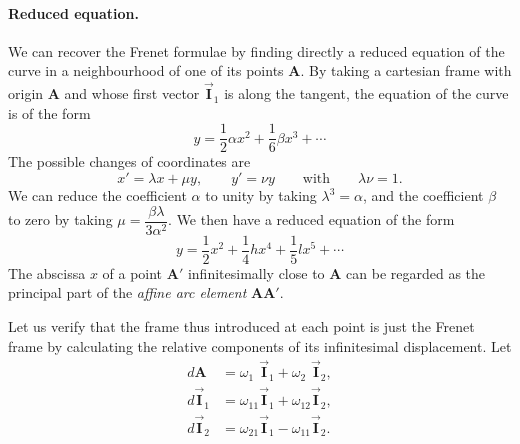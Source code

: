 \documentclass[leqno,11pt]{book}
\numberwithin{equation}{chapter}
\theoremstyle{shape1}
\theoremstyle{shapesmall}
\newcommand{\rvec}[1]{\vec{\mathbf{#1}}}
\newcommand{\ivec}{\rvec{I}}
\begin{document}
\paragraph{Reduced equation.}
\label{sec:139}
We can recover the Frenet formulae by finding directly a reduced equation of the curve in a neighbourhood of one of its points $\mathbf{A}$. By taking a cartesian frame with origin $\mathbf{A}$ and whose first vector $\ivec_{1}$ is along the tangent, the equation of the curve is of the form
\[
y=\frac{1}{2}\alpha x^{2}+\frac{1}{6}\beta x^{3}+\cdots
\]
The possible changes of coordinates are
\[
x'=\lambda x+\mu y,\qquad y'=\nu y\qquad\text{with}\qquad\lambda \nu=1.
\]
We can reduce the coefficient $\alpha$ to unity by taking $\lambda^{3}=\alpha$, and the coefficient $\beta$ to zero by taking $\mu=\dfrac{\beta\lambda}{3\alpha^{2}}$. We then have a reduced equation of the form
\[
y=\frac{1}{2}x^{2}+\frac{1}{4} hx^{4}+\frac{1}{5} lx^{5}+\cdots
\]
The abscissa $x$ of a point $\mathbf{A}'$ infinitesimally close to $\mathbf{A}$ can be regarded as the principal part of the \emph{affine arc element} $\mathbf{AA}'$.

Let us verify that the frame thus introduced at each point is just the Frenet frame by calculating the relative components of its infinitesimal displacement. Let
\begin{align*}
  d\mathbf{A}&=\omega_{1\phantom{0}}\ivec_{1}+\omega_{2\phantom{0}}\ivec_{2},\\
  d\ivec_{1}&=\omega_{11}\ivec_{1}+\omega_{12}\ivec_{2},\\
  d\ivec_{2}&=\omega_{21}\ivec_{1}-\omega_{11}\ivec_{2}.
\end{align*}
\end{document}
